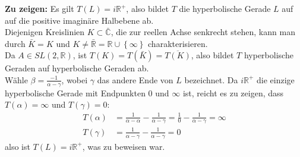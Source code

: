 \begin{problem*}[3b]
  \textbf{Zu zeigen:} Es gilt \( T(L) = i \mathbb{R}^{+} \), also bildet \( T \) die hyperbolische Gerade \( L \) auf auf die positive imaginäre Halbebene ab. \\
  Diejenigen Kreislinien \( K \subset \bar{\mathbb{C}} \), die zur reellen Achse senkrecht stehen, kann man durch \( \bar{K} = K \) und \( K \neq \bar{\mathbb{R}} = \mathbb{R} \cup \left \{ \infty \right \} \) charakterisieren. \\
  Da \( A \in SL(2, \mathbb{R}) \), ist \( T(K) = T(\bar{K}) = \overline{T(K)} \), also bildet \( T \) hyperbolische Geraden auf hyperbolische Geraden ab. \\
  Wähle \( \beta = \frac{-1}{\alpha - \gamma} \), wobei \( \gamma \) das andere Ende von \( L \) bezeichnet. Da \( i \mathbb{R}^{+} \) die einzige hyperbolische Gerade mit Endpunkten \( 0 \) und \( \infty \) ist, reicht es zu zeigen, dass \( T(\alpha) = \infty \) und \( T(\gamma) = 0 \): \\
  \begin{align*}
    T(\alpha) &= \frac{1}{\alpha - \alpha} - \frac{1}{\alpha - \gamma} = \frac{1}{0} - \frac{1}{\alpha - \gamma} = \infty \\
    T(\gamma) &= \frac{1}{\alpha - \gamma} - \frac{1}{\alpha - \gamma} = 0 
  \end{align*}
  also ist \( T(L) = i \mathbb{R}^{+} \), was zu beweisen war.
\end{problem*}
